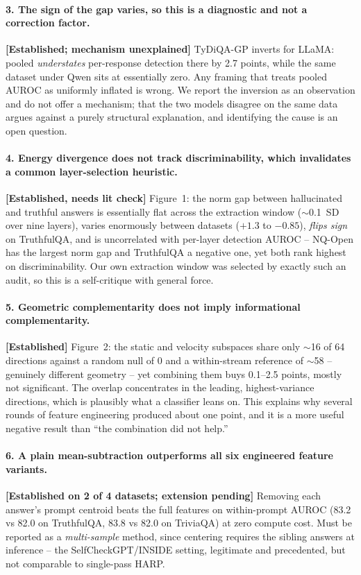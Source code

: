 \documentclass[11pt,a4paper]{article}
\begin{document}
\paragraph{3. The sign of the gap varies, so this is a diagnostic and not a correction factor.}
\textbf{[Established; mechanism unexplained]} TyDiQA-GP inverts for LLaMA: pooled
\emph{understates} per-response detection there by 2.7 points, while the same dataset under Qwen
sits at essentially zero. Any framing that treats pooled AUROC as uniformly inflated is wrong. We
report the inversion as an observation and do not offer a mechanism; that the two models disagree
on the same data argues against a purely structural explanation, and identifying the cause is an
open question.

\paragraph{4. Energy divergence does not track discriminability, which invalidates a common
layer-selection heuristic.} \textbf{[Established, needs lit check]} Figure~1: the norm gap between
hallucinated and truthful answers is essentially flat across the extraction window
($\sim$0.1~SD over nine layers), varies enormously between datasets ($+1.3$ to $-0.85$),
\emph{flips sign} on TruthfulQA, and is uncorrelated with per-layer detection AUROC -- NQ-Open has
the largest norm gap and TruthfulQA a negative one, yet both rank highest on discriminability. Our
own extraction window was selected by exactly such an audit, so this is a self-critique with
general force.

\paragraph{5. Geometric complementarity does not imply informational complementarity.}
\textbf{[Established]} Figure~2: the static and velocity subspaces share only $\sim$16 of 64
directions against a random null of 0 and a within-stream reference of $\sim$58 -- genuinely
different geometry -- yet combining them buys 0.1--2.5 points, mostly not significant. The overlap
concentrates in the leading, highest-variance directions, which is plausibly what a classifier
leans on. This explains why several rounds of feature engineering produced about one point, and it
is a more useful negative result than ``the combination did not help.''

\paragraph{6. A plain mean-subtraction outperforms all six engineered feature variants.}
\textbf{[Established on 2 of 4 datasets; extension pending]} Removing each answer's prompt centroid
beats the full features on within-prompt AUROC (83.2 vs 82.0 on TruthfulQA, 83.8 vs 82.0 on
TriviaQA) at zero compute cost. Must be reported as a \emph{multi-sample} method, since centering
requires the sibling answers at inference -- the SelfCheckGPT/INSIDE setting, legitimate and
precedented, but not comparable to single-pass HARP.
\end{document}
